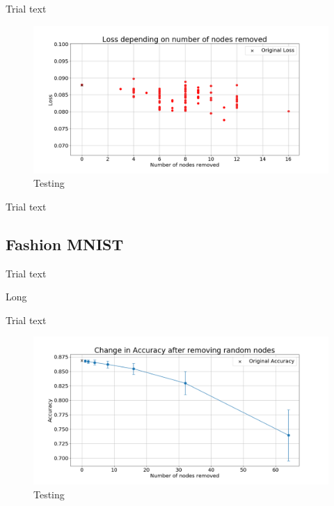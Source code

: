 \documentclass[UKenglish]{ifimaster}
\begin{document}
            Trial text

            \begin{figure}[h!]\centering
                \includegraphics[width=\textwidth]{Loss_vs_nodes_removed_mnist.png}
                \caption[Short title]{Testing}
                \label{fig:loss_rn_imp_mnist}
            \end{figure}

            Trial text

        \subsection{Fashion MNIST}

            Trial text

            \begin{table}[h!]
                \centering
                \resizebox{\textwidth}{!}{}
                \caption[Short]{Long}
                \label{tab:ac_rnd_rem_fmnist}
            \end{table}

            Trial text

            \begin{figure}[h!]\centering
                \includegraphics[width=\textwidth]{Accuracy_change_random_removal_fmnist.png}
                \caption[Short title]{Testing}
                \label{fig:acc_rn_fmnist}
            \end{figure}
\end{document}
